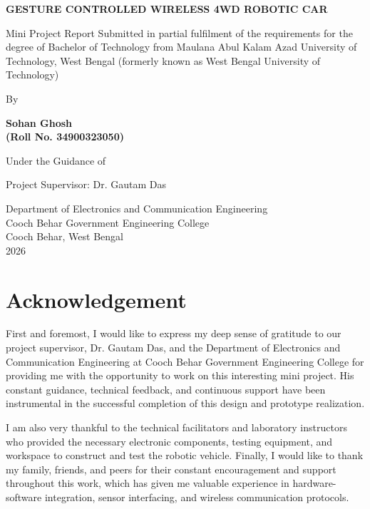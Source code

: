 \documentclass[12pt,a4paper,oneside]{report}
\begin{document}
\begin{titlepage}
\centering
{}
\vspace*{0.5in}
{\fontsize{28}{34}\selectfont\bfseries GESTURE CONTROLLED WIRELESS 4WD ROBOTIC CAR\par}
\vspace{0.8in}
{\fontsize{14}{18}\selectfont Mini Project Report Submitted in partial fulfilment of the requirements for the degree of Bachelor of Technology from Maulana Abul Kalam Azad University of Technology, West Bengal (formerly known as West Bengal University of Technology)\par}
\vspace{0.8in}
{\fontsize{14}{18}\selectfont By\par}
\vspace{0.2in}
{\fontsize{18}{22}\selectfont\bfseries Sohan Ghosh \\ (Roll No. 34900323050)\par}
\vspace{0.8in}
{\fontsize{14}{18}\selectfont Under the Guidance of\par}
\vspace{0.2in}
{\fontsize{16}{20}\selectfont Project Supervisor: Dr. Gautam Das\par}
\vfill
{\fontsize{14}{18}\selectfont Department of Electronics and Communication Engineering \\ Cooch Behar Government Engineering College \\ Cooch Behar, West Bengal \\ 2026\par}
\vspace*{0.2in}
\end{titlepage}


\newpage
\chapter*{Acknowledgement}
\vspace{0.1in}
First and foremost, I would like to express my deep sense of gratitude to our project supervisor, Dr. Gautam Das, and the Department of Electronics and Communication Engineering at Cooch Behar Government Engineering College for providing me with the opportunity to work on this interesting mini project. His constant guidance, technical feedback, and continuous support have been instrumental in the successful completion of this design and prototype realization.\par
\medskip
I am also very thankful to the technical facilitators and laboratory instructors who provided the necessary electronic components, testing equipment, and workspace to construct and test the robotic vehicle. Finally, I would like to thank my family, friends, and peers for their constant encouragement and support throughout this work, which has given me valuable experience in hardware-software integration, sensor interfacing, and wireless communication protocols.\par
\end{document}
